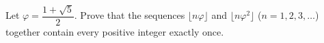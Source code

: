 Let $\varphi=\dfrac{1+\sqrt5}{2}$. Prove that the sequences $\lfloor n\varphi\rfloor$ and $\lfloor n\varphi^2\rfloor$ ($n=1,2,3,\dots$) together contain every positive integer exactly once.
